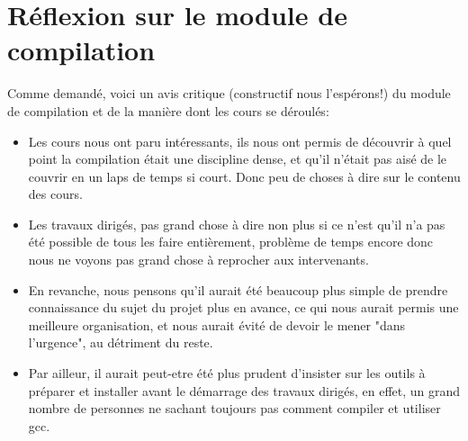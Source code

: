 %

\section{Réflexion sur le module de compilation}

Comme demandé, voici un avis critique (constructif nous l'espérons!) du module de compilation et de la manière dont les cours se déroulés:\\

\begin{itemize}

\item Les cours nous ont paru intéressants, ils nous ont permis de découvrir à quel point la compilation était une discipline dense, et qu'il n'était pas aisé de le couvrir en un laps de temps si court. Donc peu de choses à dire sur le contenu des cours.\\

\item Les travaux dirigés, pas grand chose à dire non plus si ce n'est qu'il n'a pas été possible de tous les faire entièrement, problème de temps encore donc nous ne voyons pas grand chose à reprocher aux intervenants.\\

\item En revanche, nous pensons qu'il aurait été beaucoup plus simple de prendre connaissance du sujet du projet plus en avance, ce qui nous aurait permis une meilleure organisation, et nous aurait évité de devoir le mener "dans l'urgence", au détriment du reste.\\

\item Par ailleur, il aurait peut-etre été plus prudent d'insister sur les outils à préparer et installer avant le démarrage des travaux dirigés, en effet, un grand nombre de personnes ne sachant toujours pas comment compiler et utiliser gcc.\\

\end{itemize}
